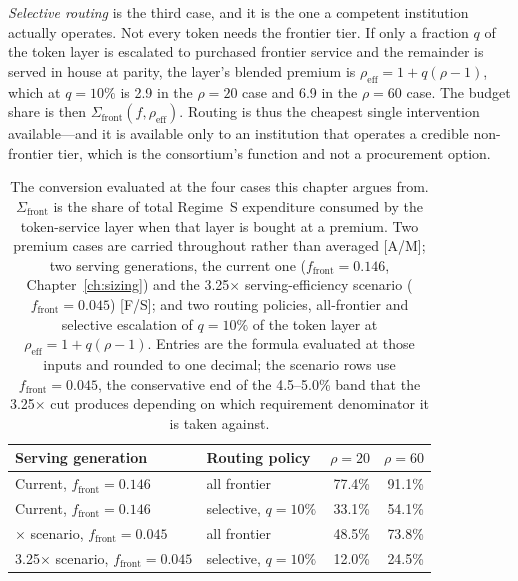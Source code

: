 \emph{Selective routing} is the third case, and it is the one a competent institution actually operates. Not every token needs the frontier tier. If only a fraction $q$ of the token layer is escalated to purchased frontier service and the remainder is served in house at parity, the layer's blended premium is $\rho_{\mathrm{eff}} = 1 + q(\rho - 1)$, which at $q = 10\%$ is 2.9 in the $\rho=20$ case and 6.9 in the $\rho=60$ case. The budget share is then $\Sigma_{\mathrm{front}}(f, \rho_{\mathrm{eff}})$. Routing is thus the cheapest single intervention available---and it is available only to an institution that operates a credible non-frontier tier, which is the consortium's function and not a procurement option.

\begin{table}[htbp]
  \centering
  \small
  \caption{The conversion evaluated at the four cases this chapter argues from. $\Sigma_{\mathrm{front}}$ is the share of total Regime~S expenditure consumed by the token-service layer when that layer is bought at a premium. Two premium cases are carried throughout rather than averaged [A/M]; two serving generations, the current one ($f_{\mathrm{front}} = 0.146$, Chapter~\ref{ch:sizing}) and the 3.25$\times$ serving-efficiency scenario ($f_{\mathrm{front}} = 0.045$) [F/S]; and two routing policies, all-frontier and selective escalation of $q = 10\%$ of the token layer at $\rho_{\mathrm{eff}} = 1 + q(\rho-1)$. Entries are the formula evaluated at those inputs and rounded to one decimal; the scenario rows use $f_{\mathrm{front}} = 0.045$, the conservative end of the 4.5--5.0\% band that the 3.25$\times$ cut produces depending on which requirement denominator it is taken against.}
  \label{tab:ai4s-cases}
  \begin{tabular}{llrr}
    \toprule
    Serving generation & Routing policy & $\rho = 20$ & $\rho = 60$ \\
    \midrule
    Current, $f_{\mathrm{front}} = 0.146$ & all frontier & 77.4\% & 91.1\% \\
    Current, $f_{\mathrm{front}} = 0.146$ & selective, $q = 10\%$ & 33.1\% & 54.1\% \\
    \addlinespace
    3.25$\times$ scenario, $f_{\mathrm{front}} = 0.045$ & all frontier & 48.5\% & 73.8\% \\
    3.25$\times$ scenario, $f_{\mathrm{front}} = 0.045$ & selective, $q = 10\%$ & 12.0\% & 24.5\% \\
    \bottomrule
  \end{tabular}
\end{table}

